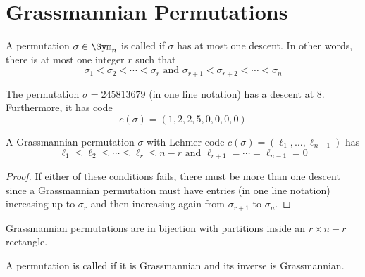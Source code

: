 \documentclass[11pt,leqno,oneside]{amsart}
\numberwithin{thm}{section}
\begin{document}
\section{Grassmannian Permutations}
\begin{defn}
  A permutation \(\sigma \in \Sym_n\) is called  if
  \(\sigma\) has at most one descent. In other words, there is at most
  one integer \(r\) such that \[
    \sigma_1 < \sigma_2 < \cdots < \sigma_r \text{ and } \sigma_{r+1}
    < \sigma_{r+2} < \cdots < \sigma_n
  \]
\end{defn}
\begin{example}
  The permutation \(\sigma = 245813679\) (in one line notation) has a
  descent at \(8\). Furthermore, it has code \[
    c(\sigma) = (1,2,2,5,0,0,0,0)
  \]
\end{example}
\begin{lem}
  A Grassmannian permutation \(\sigma\) with Lehmer code \(c(\sigma) =
  (\ell_1, \ldots, \ell_{n-1})\) has \[
    \ell_1 \leq \ell_2 \leq \cdots \leq \ell_r \leq n-r \text { and }
    \ell_{r+1} = \cdots = \ell_{n-1} = 0
  \]
\end{lem}
\begin{proof}
  If either of these conditions fails, there must be more than one
  descent since a Grassmannian permutation must have entries (in one
  line notation) increasing up to \(\sigma_r\) and then increasing
  again from \(\sigma_{r+1}\) to \(\sigma_n\).
\end{proof}
\begin{prop}
  Grassmannian permutations are in bijection with partitions inside
  an \(r \times n-r\) rectangle.
\end{prop}
\begin{defn}
  A permutation is called  if it is Grassmannian
  and its inverse is Grassmannian.
\end{defn}
\end{document}
